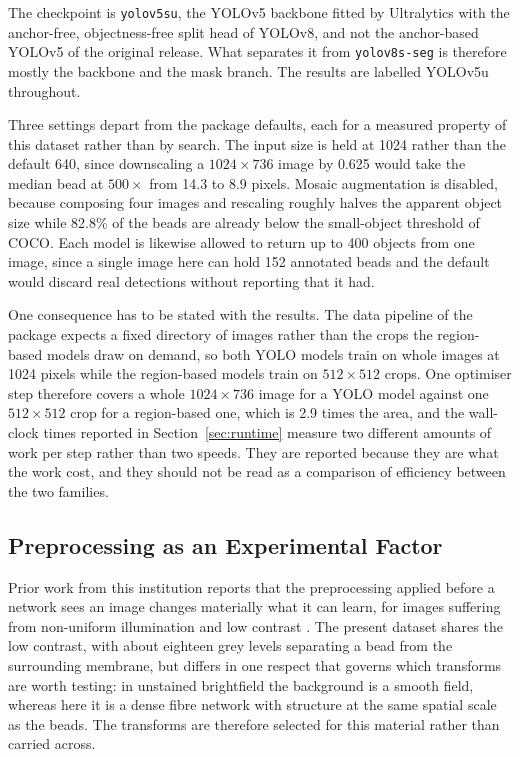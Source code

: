The checkpoint is \texttt{yolov5su}, the YOLOv5 backbone fitted by Ultralytics
with the anchor-free, objectness-free split head of YOLOv8, and not the
anchor-based YOLOv5 of the original release. What separates it from
\texttt{yolov8s-seg} is therefore mostly the backbone and the mask branch. The
results are labelled YOLOv5u throughout.

Three settings depart from the package defaults, each for a measured property of
this dataset rather than by search. The input size is held at 1024 rather than the
default 640, since downscaling a $1024 \times 736$ image by 0.625 would take
the median bead at $500\times$ from 14.3 to 8.9 pixels. Mosaic augmentation is
disabled, because composing four images and rescaling roughly halves the apparent
object size while 82.8\% of the beads are already below the small-object
threshold of COCO. Each model is likewise allowed to return up to 400 objects from one
image, since a single image here can hold 152 annotated beads and the default
would discard real detections without reporting that it had.

One consequence has to be stated with the results. The data pipeline of the
package expects a fixed directory of images rather than the crops the region-based
models draw on demand, so both YOLO models train on whole images at 1024
pixels while the region-based models train on $512 \times 512$ crops. One
optimiser step therefore covers a whole $1024 \times 736$ image for a YOLO model
against one $512 \times 512$ crop for a region-based one, which is 2.9 times the
area, and the wall-clock times reported in
Section~\ref{sec:runtime} measure two different amounts of work per step rather
than two speeds. They are reported because they are what the work cost, and
they should not be read as a comparison of efficiency between the two families.

\subsection{Preprocessing as an Experimental Factor}
\label{sec:preprocessing_method}

Prior work from this institution reports that the preprocessing applied before a
network sees an image changes materially what it can learn, for images
suffering from non-uniform illumination and low contrast
\cite{uka2020preprocessing}. The present dataset shares the low contrast, with
about eighteen grey levels separating a bead from the surrounding membrane, but
differs in one respect that governs which transforms are worth testing: in
unstained brightfield the background is a smooth field, whereas here it is a dense
fibre network with structure at the same spatial scale as the beads. The
transforms are therefore selected for this material rather than carried across.


